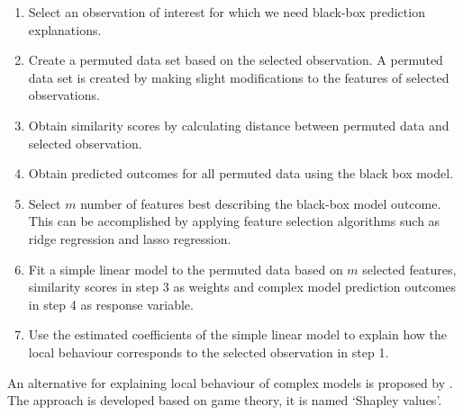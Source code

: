 \documentclass[11pt,a4paper,]{article}
\providecommand{\tightlist}{%
  \setlength{\itemsep}{0pt}\setlength{\parskip}{0pt}}
\begin{document}
\begin{enumerate}
\def\labelenumi{\arabic{enumi}.}
\tightlist
\item
  Select an observation of interest for which we need black-box prediction explanations.
\item
  Create a permuted data set based on the selected observation. A permuted data set is created by making slight modifications to the features of selected observations.
\item
  Obtain similarity scores by calculating distance between permuted data and selected observation.
\item
  Obtain predicted outcomes for all permuted data using the black box model.
\item
  Select \(m\) number of features best describing the black-box model outcome. This can be accomplished by applying feature selection algorithms such as ridge regression and lasso regression.
\item
  Fit a simple linear model to the permuted data based on \(m\) selected features, similarity scores in step 3 as weights and complex model prediction outcomes in step 4 as response variable.
\item
  Use the estimated coefficients of the simple linear model to explain how the local behaviour corresponds to the selected observation in step 1.
\end{enumerate}

An alternative for explaining local behaviour of complex models is proposed by \textcite{lundberg2017unified}. The approach is developed based on game theory, it is named `Shapley values'.
\end{document}
